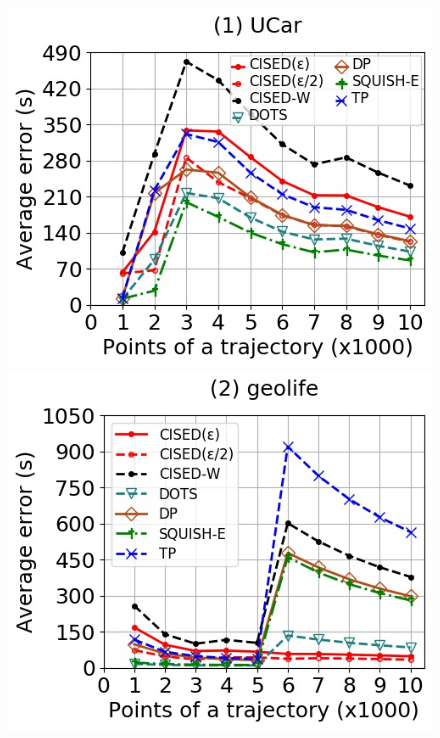 {\begin{figure}[tb!]
	\centering
	\includegraphics[scale=0.350]{Figures/Exp-when-SED-error-size-service.jpg} 	\hspace{0.5ex}
	\includegraphics[scale=0.350]{Figures/Exp-when-SED-error-size-geolife.jpg}	\hspace{0.5ex}

\end{figure}}
